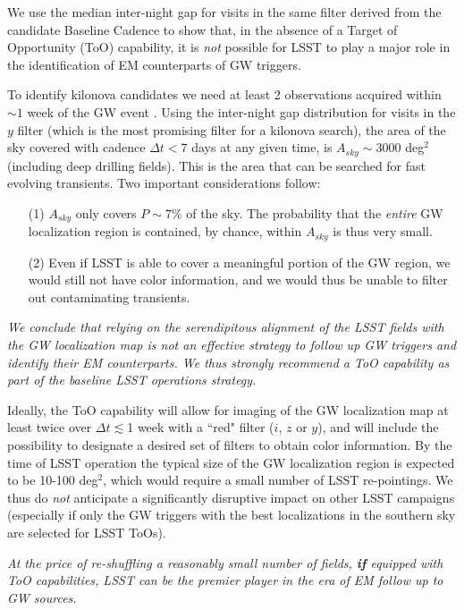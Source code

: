 We use the median inter-night gap  for visits in the same filter derived
from the candidate Baseline Cadence  to show that,
in the absence of a Target of Opportunity (ToO) capability, it is
\emph{not} possible for LSST  to play a major role in the identification
of EM counterparts of GW triggers.

To identify kilonova candidates we need at least 2 observations acquired
within $\sim 1$ week  of the GW event \citep{Cowperthwaite15}. Using the
inter-night gap distribution for visits in the $y$ filter (which is the
most promising filter for a kilonova search), the area of the sky
covered with cadence  $\Delta t<7$ days at any given time, is
$A_{sky}\sim 3000$ deg$^2$ (including deep drilling fields).  This is
the area that can be searched for fast evolving transients.  Two
important considerations follow:

\begin{itemize}
\item[(1)] $A_{sky}$ only covers $P\sim7$\% of the sky. The  probability
that the \emph{entire} GW localization region is contained, by chance,
within $A_{sky}$ is thus very small.
\item[(2)] Even if LSST is able to cover a meaningful portion of the GW
region, we would still not have color information, and we would thus be
unable to filter out contaminating transients.
\end{itemize}

\textit{We conclude that relying on the serendipitous alignment of the
LSST fields with the GW localization map is not an effective strategy to
follow up GW triggers and identify their EM counterparts. We thus
strongly recommend a ToO capability as part of the baseline LSST
operations strategy.}

Ideally, the ToO capability will allow for imaging of the GW
localization map at least twice over $\Delta t\lesssim$1 week with a
``red" filter ($i$, $z$  or $y$),  and  will include the possibility to
designate a desired set of filters to obtain color information. By the
time of LSST operation the typical size of the GW localization region is
expected to be 10-100 deg$^2$, which would require a small number of
LSST re-pointings. We thus do \emph{not} anticipate a significantly
disruptive impact on other LSST campaigns (especially if only the GW
triggers with the best localizations in the southern sky are selected
for LSST ToOs).

\textit{At the price of re-shuffling a reasonably small number of
fields, \textbf{if} equipped with ToO capabilities, LSST can be the
premier player in the era of EM follow up to GW sources.}

